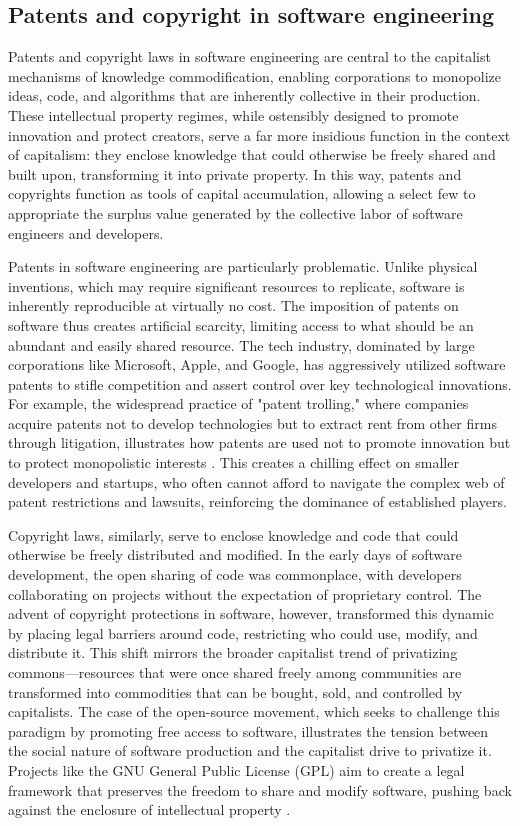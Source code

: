 \subsection{Patents and copyright in software engineering}

Patents and copyright laws in software engineering are central to the capitalist mechanisms of knowledge commodification, enabling corporations to monopolize ideas, code, and algorithms that are inherently collective in their production. These intellectual property regimes, while ostensibly designed to promote innovation and protect creators, serve a far more insidious function in the context of capitalism: they enclose knowledge that could otherwise be freely shared and built upon, transforming it into private property. In this way, patents and copyrights function as tools of capital accumulation, allowing a select few to appropriate the surplus value generated by the collective labor of software engineers and developers.

Patents in software engineering are particularly problematic. Unlike physical inventions, which may require significant resources to replicate, software is inherently reproducible at virtually no cost. The imposition of patents on software thus creates artificial scarcity, limiting access to what should be an abundant and easily shared resource. The tech industry, dominated by large corporations like Microsoft, Apple, and Google, has aggressively utilized software patents to stifle competition and assert control over key technological innovations. For example, the widespread practice of "patent trolling," where companies acquire patents not to develop technologies but to extract rent from other firms through litigation, illustrates how patents are used not to promote innovation but to protect monopolistic interests \cite[pp.~38-40]{bessen2014}. This creates a chilling effect on smaller developers and startups, who often cannot afford to navigate the complex web of patent restrictions and lawsuits, reinforcing the dominance of established players.

Copyright laws, similarly, serve to enclose knowledge and code that could otherwise be freely distributed and modified. In the early days of software development, the open sharing of code was commonplace, with developers collaborating on projects without the expectation of proprietary control. The advent of copyright protections in software, however, transformed this dynamic by placing legal barriers around code, restricting who could use, modify, and distribute it. This shift mirrors the broader capitalist trend of privatizing commons—resources that were once shared freely among communities are transformed into commodities that can be bought, sold, and controlled by capitalists. The case of the open-source movement, which seeks to challenge this paradigm by promoting free access to software, illustrates the tension between the social nature of software production and the capitalist drive to privatize it. Projects like the GNU General Public License (GPL) aim to create a legal framework that preserves the freedom to share and modify software, pushing back against the enclosure of intellectual property \cite[pp.~25-27]{stallman2002}.

